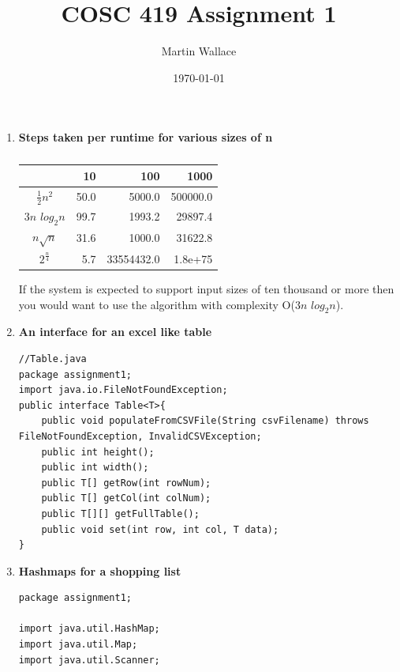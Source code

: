 \documentclass{article}
\title{COSC 419 Assignment 1}
\author{Martin Wallace }
\date{\today}
\begin{document}
\maketitle
\begin{enumerate}
  \item \textbf{Steps taken per runtime for various sizes of n}
  \\  
  \begin{table}[H]
    \caption{}
    \centering
    \setlength{\tabcolsep}{0.5em} %
	{\renewcommand{\arraystretch}{1.2}%
    \begin{tabular}{| c | r | r | r |}
    \hline
                           & 10     & 100         & 1000 \\
    \hline
    \(\frac{1}{2} n^2\)    &  50.0  &  5000.0     & 500000.0   \\
    \hline
    \(3n \) \(log_2 n\)    &  99.7  & 1993.2      & 29897.4    \\
    \hline
    \(n\sqrt{n}\)          &  31.6  & 1000.0      & 31622.8    \\
    \hline
    \(2^{\frac{n}{4}}\)    &  5.7   & 33554432.0  & 1.8e+75    \\
    \hline
    \end{tabular}
    }
  \end{table}
  
  If the system is expected to support input sizes of ten thousand or more then you would want to use the algorithm with complexity O(\(3n \) \(log_2 n\)).
  
  \item \textbf{An interface for an excel like table }
  \begin{lstlisting}
//Table.java
package assignment1;
import java.io.FileNotFoundException;
public interface Table<T>{
    public void populateFromCSVFile(String csvFilename) throws FileNotFoundException, InvalidCSVException;
    public int height();
    public int width();
    public T[] getRow(int rowNum);
    public T[] getCol(int colNum);
    public T[][] getFullTable();
    public void set(int row, int col, T data);
}
 \end{lstlisting}
 
 \item \textbf{Hashmaps for a shopping list}
 \begin{lstlisting}
package assignment1;

import java.util.HashMap;
import java.util.Map;
import java.util.Scanner;


\end{lstlisting}
\end{enumerate}
\end{document}
